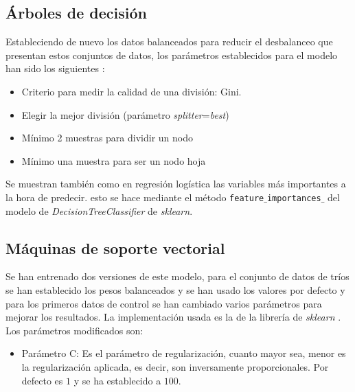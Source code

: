 \subsection{Árboles de decisión}
Estableciendo de nuevo los datos balanceados para reducir el desbalanceo que presentan estos conjuntos de datos, los parámetros establecidos para el modelo han sido los siguientes \cite{scikit2021dt}:
\begin{itemize}
\itemsep 0em 
  \item Criterio para medir la calidad de una división: Gini.
  \item Elegir la mejor división (parámetro \textit{splitter}=\textit{best})
  \item Mínimo 2 muestras para dividir un nodo
  \item Mínimo una muestra para ser un nodo hoja
\end{itemize}
Se muestran también como en regresión logística las variables más importantes a la hora de predecir. esto se hace mediante el método \texttt{feature$\_$importances$\_$} del modelo de \textit{DecisionTreeClassifier} de \textit{sklearn}.
\subsection{Máquinas de soporte vectorial}
Se han entrenado dos versiones de este modelo, para el conjunto de datos de tríos se han establecido los pesos balanceados y se han usado los valores por defecto y para los primeros datos de control se han cambiado varios parámetros para mejorar los resultados. La implementación usada es la de la librería de \textit{sklearn} \cite{scikit2021svm}. Los parámetros modificados son:
\begin{itemize}
\itemsep 0em 
  \item Parámetro C: Es el parámetro de regularización, cuanto mayor sea, menor es la regularización aplicada, es decir, son inversamente proporcionales. Por defecto es $1$ y se ha establecido a $100$.

\end{itemize}


\endinput









